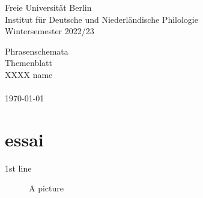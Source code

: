 \documentclass{article}
\begin{document}
\begin{flushleft}
Freie Universität Berlin\\
Institut für Deutsche und Niederländische Philologie\\

Wintersemester 2022/23
\end{flushleft}

\vspace{0.2cm}

\begin{center}
\LARGE{Phrasenschemata}\\[10pt]
\Large{Themenblatt}\\[10pt]
\large{XXXX name}\\[3pt]
\small{}\\[10pt]
\large{\today}\\[30pt]
\end{center}


\section{essai}
1st line\\[14pt]

\begin{figure}[h]\label{figure1}
\centering

  \caption{A picture}
  \end{figure}
\end{document}
